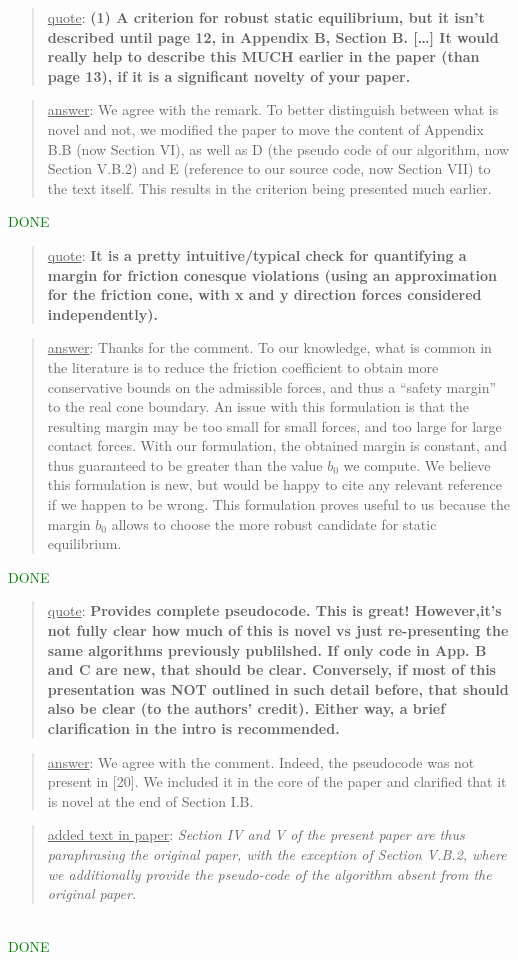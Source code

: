 \documentclass[a4paper]{article}
\newcommand{\done}[0]{\textcolor{green}{DONE}}
\newcommand\quot[1]{\begin{quote} \underline{quote}: \textbf{#1}\end{quote}}
\newcommand\as[1]{\begin{quote} \underline{answer}: {#1}\end{quote} }
\newcommand\qt[1]{\begin{quote} \underline{added text in paper}: \textit{#1}\end{quote} \leavevmode \\ }
\newcommand\jp{ \leavevmode \\}
\begin{document}
\quot { (1) A criterion for robust static equilibrium, but it isn't
described until page 12, in Appendix B, Section B. [\dots]  It would really help to describe this MUCH earlier in
the paper (than page 13), if it is a significant novelty of your paper.}

\as{We agree with the remark. To better distinguish between what is novel and not, we modified the paper to move the content of Appendix B.B (now Section VI), as well as D  (the pseudo code of our algorithm, now Section V.B.2) and E (reference to our source code, now Section VII) to the text itself. This results in the criterion being presented much earlier.}\done \jp

\quot{It is a pretty intuitive/typical check for quantifying a
margin for friction conesque violations (using an approximation for
the friction cone, with x and y direction forces considered
independently). }

\as{Thanks for the comment. To our knowledge, what is common in the literature is to reduce the friction coefficient to obtain more conservative bounds on the admissible forces, and thus a ``safety margin'' to the real cone boundary. An issue with this formulation is that the resulting margin may be too small for small forces, and too large for large contact forces. With our formulation, the obtained margin is constant, and thus guaranteed to be greater than the value $b_0$ we compute. We believe this formulation is new, but would be happy to cite any relevant reference if we happen to be wrong. This formulation proves useful to us because the margin $b_0$ allows to choose the more robust candidate for static equilibrium.}\done

\quot{
Provides complete pseudocode.  This is great! However,it's
not fully clear how much of this is novel vs just re-presenting the
same algorithms previously publilshed.	If only code in App. B and C
are new, that should be clear. Conversely, if most of this presentation
was NOT outlined in such detail before, that should also be clear (to
the authors' credit). Either way, a brief clarification in the intro is
recommended.}

\as{We agree with the comment. Indeed, the pseudocode was not present in [20]. We included it in the core of the paper and clarified that it is novel at the end
of Section I.B.}
\qt{Section IV and V of the present paper are thus paraphrasing the original paper, with the exception of Section V.B.2, where we additionally provide the pseudo-code of the algorithm absent from the original paper.}
\done
\end{document}
